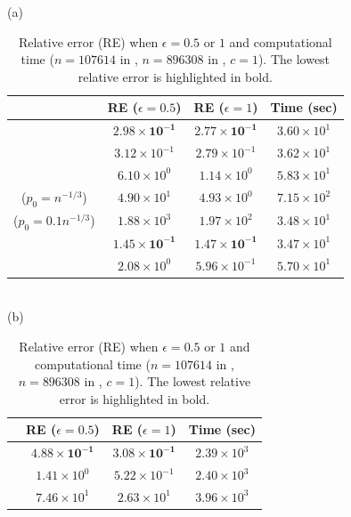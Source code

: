 \begin{table}[t]
  \caption[Relative error (RE) when $\epsilon=0.5$ or $1$ and computational time.]
	{Relative error (RE) when $\epsilon=0.5$ or $1$ and computational time ($n=107614$ in \Gplus{}, $n=896308$ in \IMDB{}, $c=1$). 
  The lowest relative error is highlighted in bold.
  }
  
  \centering
  (a) \Gplus{}\\
  \begin{tabular}{|c|c|c|c|}
    \hline
    & RE ($\epsilon=0.5$) & RE ($\epsilon=1$) & Time (sec)\\ \hline
    \AlgWSTriVR{} & $\bm{2.98 \times 10^{-1}}$ & $\bm{2.77 \times 10^{-1}}$ & $3.60 \times 10^1$ \\ \hline
    \AlgWSTri{} & $3.12 \times 10^{-1}$ & $2.79 \times 10^{-1}$ & $3.62 \times 10^1$ \\ \hline
    \AlgWLTri{} & $6.10 \times 10^0$ & $1.14 \times 10^0$ & $5.83 \times 10^1$ \\ \hline
    \AlgARRTri{} ($p_0=n^{-1/3}$) & $4.90 \times 10^1$ & $4.93 \times 10^0$ & $7.15 \times 10^2$ \\ \hline
    \hspace{-0.5mm}\AlgARRTri{} ($p_0=0.1n^{-1/3}$)\hspace{-0.5mm} & $1.88 \times 10^3$ & $1.97 \times 10^2$ & $3.48 \times 10^1$ \\ \hline \hline
    \AlgWSCyc{} & $\bm{1.45 \times 10^{-1}}$ & $\bm{1.47 \times 10^{-1}}$ & $3.47 \times 10^1$ \\ \hline
    \AlgWLCyc{} & $2.08 \times 10^0$ & $5.96 \times 10^{-1}$ & $5.70 \times 10^1$ \\ \hline
  \end{tabular}\\
  (b) \IMDB{}\\
  \begin{tabular}{|c|c|c|c|}
    \hline
    & RE ($\epsilon=0.5$) & RE ($\epsilon=1$) & Time (sec)\\ \hline
    \AlgWSTriVR{} & $\bm{4.88 \times 10^{-1}}$ & $\bm{3.08 \times 10^{-1}}$ & $2.39 \times 10^3$ \\ \hline
    \AlgWSTri{} & $1.41 \times 10^0$ & $5.22 \times 10^{-1}$ & $2.40 \times 10^3$ \\ \hline
    \AlgWLTri{} & $7.46 \times 10^1$ & $2.63 \times 10^1$ & $3.96 \times 10^3$ \\ \hline

\end{tabular}
\end{table}
